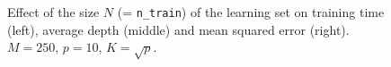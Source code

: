 \begin{figure}
\hspace{-1.75cm}
\caption{Effect of the size $N$ (= \texttt{n\_train}) of the learning set on training time (left), average depth (middle) and mean squared error (right). $M=250$, $p=10$, $K=\sqrt{p}$.}
\label{fig:5:artificial:N}
\end{figure}

